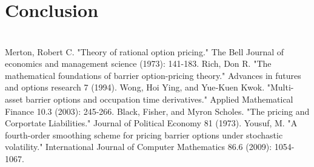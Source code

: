 \documentclass[11pt]{article}
\begin{document}
\section{Conclusion}



\newpage
\section*{} \label{bibsection}


\begin{thebibliography}{MMMMM} 
 Merton, Robert C. "Theory of rational option pricing." The Bell Journal of economics and management science (1973): 141-183.
 Rich, Don R. "The mathematical foundations of barrier option-pricing theory." Advances in futures and options research 7 (1994).
 Wong, Hoi Ying, and Yue‐Kuen Kwok. "Multi-asset barrier options and occupation time derivatives." Applied Mathematical Finance 10.3 (2003): 245-266.
Black, Fisher, and Myron Scholes. "The pricing and Corportate Liabilities." Journal of Political Economy 81 (1973).
 Yousuf, M. "A fourth-order smoothing scheme for pricing barrier options under stochastic volatility." International Journal of Computer Mathematics 86.6 (2009): 1054-1067.

\end{thebibliography}


\end{document}
